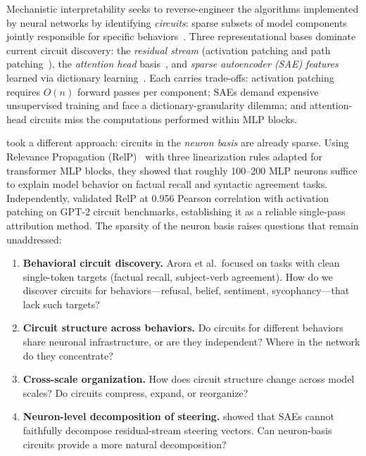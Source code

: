 \documentclass[11pt]{article}
\begin{document}
Mechanistic interpretability seeks to reverse-engineer the algorithms implemented by neural networks by identifying \emph{circuits}: sparse subsets of model components jointly responsible for specific behaviors~\citep{conmy2023acdc, wang2023ioi, elhage2022toy}.
Three representational bases dominate current circuit discovery: the \emph{residual stream} (activation patching and path patching~\citep{meng2022rome, goldowskydill2023localizing}), the \emph{attention head} basis~\citep{wang2023ioi}, and \emph{sparse autoencoder (SAE) features} learned via dictionary learning~\citep{cunningham2023sae, bricken2023monosemanticity, templeton2024scaling, marks2024sparse}.
Each carries trade-offs: activation patching requires $O(n)$ forward passes per component; SAEs demand expensive unsupervised training and face a dictionary-granularity dilemma; and attention-head circuits miss the computations performed within MLP blocks.

\citet{arora2025circuits} took a different approach: circuits in the \emph{neuron basis} are already sparse.
Using Relevance Propagation (RelP)~\citep{achtibat2024relp, bach2015pixel} with three linearization rules adapted for transformer MLP blocks, they showed that roughly 100--200 MLP neurons suffice to explain model behavior on factual recall and syntactic agreement tasks.
Independently, \citet{jafari2025relp} validated RelP at 0.956 Pearson correlation with activation patching on GPT-2 circuit benchmarks, establishing it as a reliable single-pass attribution method.
The sparsity of the neuron basis raises questions that remain unaddressed:

\begin{enumerate}[leftmargin=2em]
    \item \textbf{Behavioral circuit discovery.} Arora et al.\ focused on tasks with clean single-token targets (factual recall, subject-verb agreement). How do we discover circuits for behaviors---refusal, belief, sentiment, sycophancy---that lack such targets?

    \item \textbf{Circuit structure across behaviors.} Do circuits for different behaviors share neuronal infrastructure, or are they independent? Where in the network do they concentrate?

    \item \textbf{Cross-scale organization.} How does circuit structure change across model scales? Do circuits compress, expand, or reorganize?

    \item \textbf{Neuron-level decomposition of steering.} \citet{mayne2024sae_steering} showed that SAEs cannot faithfully decompose residual-stream steering vectors. Can neuron-basis circuits provide a more natural decomposition?
\end{enumerate}
\end{document}
